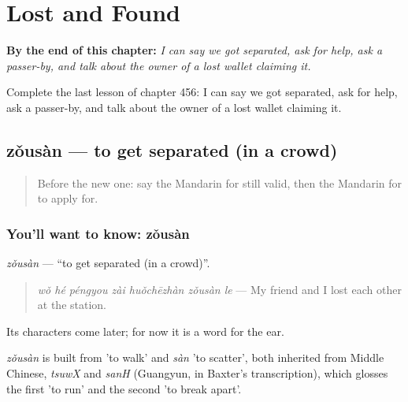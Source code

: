 
\chapter{Lost and Found}
\label{ch:zh-lost-and-found}

\begin{chapteropening}
\textbf{By the end of this chapter:} \emph{I can say we got separated, ask for help, ask a passer-by, and talk about the owner of a lost wallet claiming it.}

Complete the last lesson of chapter 456: I can say we got separated, ask for help, ask a passer-by, and talk about the owner of a lost wallet claiming it.
\end{chapteropening}

\section[zǒusàn]{zǒusàn — to get separated (in a crowd)}

\label{lesson:ZH-C456-zousan}



\begin{quote}
Before the new one: say the Mandarin for still valid, then the Mandarin for to apply for.
\end{quote}

\subsection*{You'll want to know: zǒusàn}
\emph{zǒusàn} — \textquotedblleft{}to get separated (in a crowd)\textquotedblright{}.

\begin{quote}
\emph{wǒ hé péngyou zài huǒchēzhàn zǒusàn le} — My friend and I lost each other at the station.
\end{quote}

Its characters come later; for now it is a word for the ear.

\begin{cousinweb}
\emph{zǒusàn} is built from  'to walk' and \emph{sàn} 'to scatter', both inherited from Middle Chinese, \emph{tsuwX} and \emph{sanH} (Guangyun, in Baxter's transcription), which glosses the first 'to run' and the second 'to break apart'.
\end{cousinweb}

